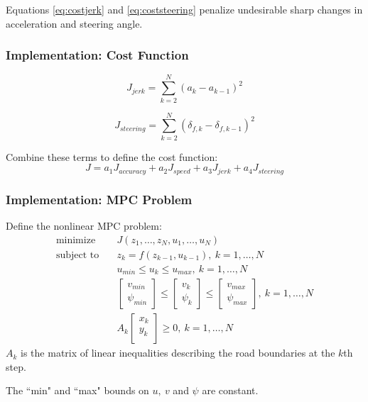 \documentclass{beamer}
\begin{document}
\begin{frame}
Equations \eqref{eq:costjerk} and \eqref{eq:coststeering} penalize undesirable sharp changes in acceleration and steering angle.
\frametitle{Implementation: Cost Function}
\begin{equation}
J_{jerk} = \sum_{k=2}^N (a_k - a_{k-1})^2
\label{eq:costjerk}
\end{equation}

\begin{equation}
J_{steering} = \sum_{k=2}^N (\delta_{f,k} - \delta_{f,k-1})^2
\label{eq:coststeering}
\end{equation}

Combine these terms to define the cost function:
\begin{equation}
J = a_1 J_{accuracy} + a_2 J_{speed} + a_3 J_{jerk} + a_4 J_{steering}
\label{eq:costfinal}
\end{equation}
\end{frame}

\begin{frame}
\frametitle{Implementation: MPC Problem}
Define the nonlinear MPC problem:
\begin{align}
\text{minimize}\quad& J(z_1,\dots,z_N, u_1,\dots,u_N)
\\
\text{subject to} \quad& z_{k} = f(z_{k-1}, u_{k-1}),\ k=1,\dots,N
\\
& u_{min} \leq u_k \leq u_{max},\ k=1,\dots,N
\\
& \begin{bmatrix}
v_{min}\\\psi_{min}
\end{bmatrix} \leq \begin{bmatrix}
v_k\\\psi_k
\end{bmatrix}\leq \begin{bmatrix}
v_{max}\\\psi_{max}
\end{bmatrix},\ k=1,\dots,N
\\
&
A_k\begin{bmatrix}
x_k\\y_k\\
\end{bmatrix} \geq 0,\ k=1,\dots,N
\end{align}
$A_k$ is the matrix of linear inequalities describing the road boundaries at the $k$th step.

The ``min" and ``max" bounds on $u,\ v$ and $\psi$ are constant.
\end{frame}
\end{document}
